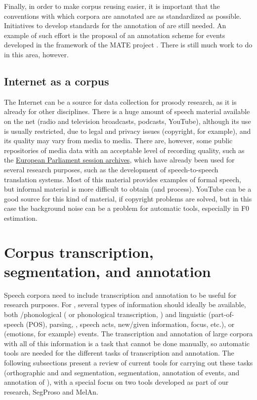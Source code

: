 \documentclass[output=paper]{langsci/langscibook}
\begin{document}
Finally, in order to make corpus reusing easier, it is important that the conventions with which corpora are annotated are as standardized as possible. Initiatives to develop standards for the annotation of  are still needed. An example of such effort is the proposal of an annotation scheme for  events developed in the framework of the MATE project \citep{Klein1998}. There is still much work to do in this area, however.

\subsection{Internet as a corpus}

The Internet can be a source for data collection for prosody research, as it is already for other disciplines. There is a huge amount of speech material available on the net (radio and television broadcasts, podcasts, YouTube), although its use is usually restricted, due to legal and privacy issues (copyright, for example), and its quality may vary from media to media. There are, however, some public repositories of media data with an acceptable level of recording quality, such as the \href{http://www.europarl.europa.eu/ep-live/en/plenary/search-by-date}{European Parliament session archives}, which have already been used for several research purposes, such as the development of speech-to-speech translation systems. Most of this material provides examples of formal speech, but informal material is more difficult to obtain (and process). YouTube can be a good source for this kind of material, if copyright problems are solved, but in this case the background noise can be a problem for automatic tools, especially in F0 estimation.

\section{Corpus transcription, segmentation, and annotation} 

Speech corpora need to include transcription and annotation to be useful for research purposes. For , several types of information should ideally be available, both /phonological ( or phonological transcription, ) and linguistic (part-of-speech (POS), parsing, , speech acts, new/given information, focus, etc.), or  (emotions, for example) events. The transcription and annotation of large corpora with all of this information is a task that cannot be done manually, so automatic tools are needed for the different tasks of transcription and annotation. The following subsections present a review of current tools for carrying out these tasks (orthographic and  and segmentation,  segmentation, annotation of  events, and annotation of ), with a special focus on two tools developed as part of our research, SegProso and MelAn.
\end{document}
